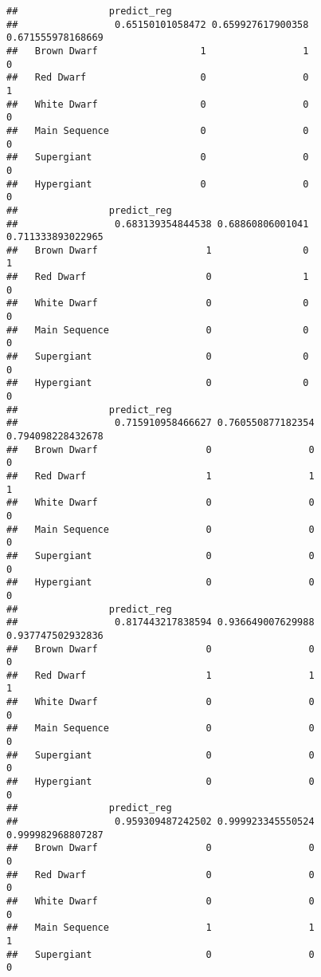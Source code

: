 \documentclass[
]{article}
\begin{document}
\begin{verbatim}
##                predict_reg
##                 0.65150101058472 0.659927617900358 0.671555978168669
##   Brown Dwarf                  1                 1                 0
##   Red Dwarf                    0                 0                 1
##   White Dwarf                  0                 0                 0
##   Main Sequence                0                 0                 0
##   Supergiant                   0                 0                 0
##   Hypergiant                   0                 0                 0
##                predict_reg
##                 0.683139354844538 0.68860806001041 0.711333893022965
##   Brown Dwarf                   1                0                 1
##   Red Dwarf                     0                1                 0
##   White Dwarf                   0                0                 0
##   Main Sequence                 0                0                 0
##   Supergiant                    0                0                 0
##   Hypergiant                    0                0                 0
##                predict_reg
##                 0.715910958466627 0.760550877182354 0.794098228432678
##   Brown Dwarf                   0                 0                 0
##   Red Dwarf                     1                 1                 1
##   White Dwarf                   0                 0                 0
##   Main Sequence                 0                 0                 0
##   Supergiant                    0                 0                 0
##   Hypergiant                    0                 0                 0
##                predict_reg
##                 0.817443217838594 0.936649007629988 0.937747502932836
##   Brown Dwarf                   0                 0                 0
##   Red Dwarf                     1                 1                 1
##   White Dwarf                   0                 0                 0
##   Main Sequence                 0                 0                 0
##   Supergiant                    0                 0                 0
##   Hypergiant                    0                 0                 0
##                predict_reg
##                 0.959309487242502 0.999923345550524 0.999982968807287
##   Brown Dwarf                   0                 0                 0
##   Red Dwarf                     0                 0                 0
##   White Dwarf                   0                 0                 0
##   Main Sequence                 1                 1                 1
##   Supergiant                    0                 0                 0

\end{verbatim}
\end{document}
